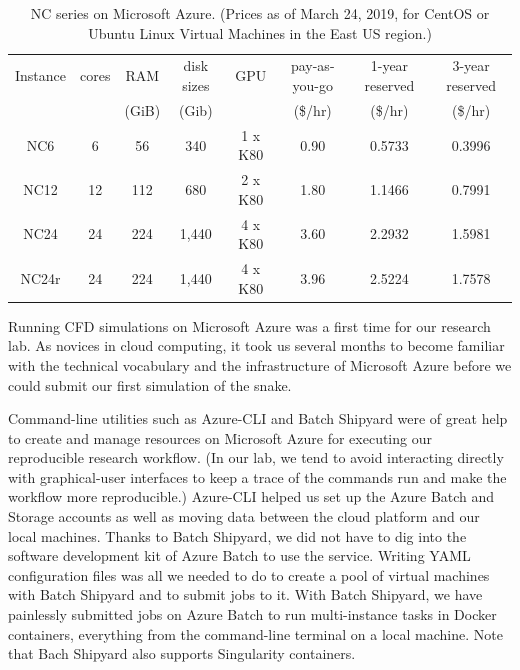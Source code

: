 \documentclass[10pt,journal,compsoc]{IEEEtran}
\begin{document}
\begin{table}[!h]
    \renewcommand{\arraystretch}{1.5}
    \caption{NC series on Microsoft Azure. (Prices as of March 24, 2019, for CentOS or Ubuntu Linux Virtual Machines in the East US region.)}
    \label{tab:nc_series}
    \centering
    \begin{tabular}{cccccccc}
        Instance & cores & RAM & disk sizes & GPU & pay-as-you-go & 1-year reserved & 3-year reserved \\
        && (GiB) & (Gib) && (\$/hr) & (\$/hr) & (\$/hr) \\
        \hline
        NC6 & 6 & 56 & 340 & 1 x K80 & 0.90 & 0.5733 & 0.3996 \\
        NC12 & 12 & 112 & 680 & 2 x K80 & 1.80 & 1.1466 & 0.7991 \\
        NC24 & 24 & 224 & 1,440 & 4 x K80 & 3.60 & 2.2932 & 1.5981 \\
        NC24r\footnotemark & 24 & 224 & 1,440 & 4 x K80 & 3.96 & 2.5224 & 1.7578 \\
        \hline
    \end{tabular}
\end{table}

Running CFD simulations on Microsoft Azure was a first time for our research lab.
As novices in cloud computing, it took us several months to become familiar with the technical vocabulary and the infrastructure of Microsoft Azure before we could submit our first simulation of the snake.

Command-line utilities such as Azure-CLI and Batch Shipyard were of great help to create and manage resources on Microsoft Azure for executing our reproducible research workflow.
(In our lab, we tend to avoid interacting directly with graphical-user interfaces to keep a trace of the commands run and make the workflow more reproducible.)
Azure-CLI helped us set up the Azure Batch and Storage accounts as well as moving data between the cloud platform and our local machines.
Thanks to Batch Shipyard, we did not have to dig into the software development kit of Azure Batch to use the service.
Writing YAML configuration files was all we needed to do to create a pool of virtual machines with Batch Shipyard and to submit jobs to it.
With Batch Shipyard, we have painlessly submitted jobs on Azure Batch to run multi-instance tasks in Docker containers, everything from the command-line terminal on a local machine.
Note that Bach Shipyard also supports Singularity containers.
\end{document}
